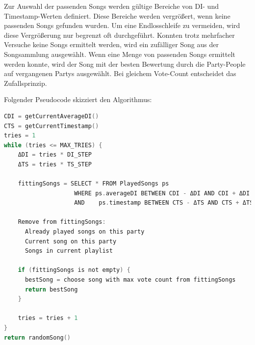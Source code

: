 Zur Auswahl der passenden Songs werden gültige Bereiche von DI- und Timestamp-Werten definiert.
Diese Bereiche werden vergrößert, wenn keine passenden Songs gefunden wurden. Um eine Endlosschleife
zu vermeiden, wird diese Vergrößerung nur begrenzt oft durchgeführt. Konnten trotz mehrfacher 
Versuche keine Songs ermittelt werden, wird ein zufälliger Song aus der Songsammlung ausgewählt.
Wenn eine Menge von passenden Songs ermittelt werden konnte, wird der Song mit der besten
Bewertung durch die Party-People auf vergangenen Partys ausgewählt. Bei gleichem Vote-Count
entscheidet das Zufallsprinzip. 

Folgender Pseudocode skizziert den Algorithmus:
\begin{lstlisting}[language=C]
CDI = getCurrentAverageDI()
CTS = getCurrentTimestamp()
tries = 1
while (tries <= MAX_TRIES) {
	ΔDI = tries * DI_STEP
	ΔTS = tries * TS_STEP
	
	fittingSongs = SELECT * FROM PlayedSongs ps
                    WHERE ps.averageDI BETWEEN CDI - ΔDI AND CDI + ΔDI
                    AND    ps.timestamp BETWEEN CTS - ΔTS AND CTS + ΔTS
				   	 
	Remove from fittingSongs: 
	  Already played songs on this party
	  Current song on this party
	  Songs in current playlist
		
	if (fittingSongs is not empty) {
	  bestSong = choose song with max vote count from fittingSongs
	  return bestSong
	}
	
	tries = tries + 1
}
return randomSong()
\end{lstlisting}